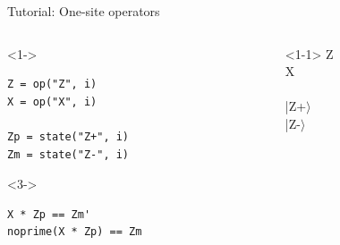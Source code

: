 \begin{frame}[fragile]{Tutorial: One-site operators}

\begin{columns}

\begin{column}{4.5cm}

\begin{onlyenv}<1->
\begin{lstlisting}[language=JuliaLocal, style=julia, basicstyle=\small]
Z = op("Z", i)
X = op("X", i)

Zp = state("Z+", i)
Zm = state("Z-", i)
\end{lstlisting}
\end{onlyenv}

\begin{onlyenv}<3->
\begin{lstlisting}[language=JuliaLocal, style=julia, basicstyle=\small]
X * Zp == Zm'
noprime(X * Zp) == Zm
\end{lstlisting}
\end{onlyenv}

\end{column}

\begin{column}{4.5cm}

\begin{onlyenv}<1-1>
Z \\
X \\
~\\
|Z+$\rangle$ \\
|Z-$\rangle$ \\
\end{onlyenv}


\end{column}
\end{columns}
\end{frame}
